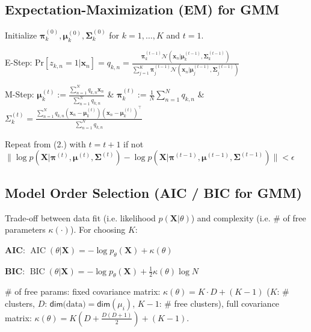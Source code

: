\documentclass[a4paper, 11pt, landscape]{article}
\newenvironment{inlinelist}%
{\begin{enumerate*}[label=\textbf{\color{red}\theenumi.}]}%
{\end{enumerate*}}
\begin{document}
\begin{multicols*}{3}
\subsection{Expectation-Maximization (EM) for GMM}
\begin{inlinelist}
	\item Initialize $\boldsymbol{\pi}_k^{(0)}, \boldsymbol{\mu}_k^{(0)}, \boldsymbol{\Sigma}_k^{(0)}$ for $k = 1, \ldots, K$ and $t=1$.
	\item E-Step: Pr$[z_{k,n} = 1 | \mathbf{x}_n] = q_{k, n} = \frac{\boldsymbol{\pi}_k^{(t-1)} \mathcal{N}(\mathbf{x}_n | \boldsymbol{\mu}_k^{(t-1)}, \boldsymbol{\Sigma}_k^{(t-1)})}{\sum_{j=1}^K \boldsymbol{\pi}_j^{(t-1)} \mathcal{N}(\mathbf{x}_n | \boldsymbol{\mu}_j^{(t-1)}, \boldsymbol{\Sigma}_j^{(t-1)})}$
	\item M-Step: $\boldsymbol{\mu}_k^{(t)} := \frac{\sum_{n=1}^N q_{k,n} \mathbf{x}_n}{\sum_{n=1}^N q_{k,n}}$\hspace{20pt} \& \hspace{20pt} $\boldsymbol{\pi}_k^{(t)} := \frac{1}{N} \sum_{n=1}^N q_{k,n}$ \hspace{20pt} \& \hspace{20pt} $\Sigma_k^{(t)} = \frac{\sum_{n=1}^N q_{k, n} (\mathbf{x}_n - \boldsymbol{\mu}_k^{(t)})(\mathbf{x}_n - \boldsymbol{\mu}_k^{(t)})^\top}{\sum_{n=1}^N q_{k,n}}$
	\item Repeat from (2.) with $t = t + 1$ if not $\| \log p(\mathbf{X} | \boldsymbol{\pi}^{(t)}, \boldsymbol{\mu}^{(t)}, \boldsymbol{\Sigma}^{(t)}) - \log p(\mathbf{X} | \boldsymbol{\pi}^{(t-1)}, \boldsymbol{\mu}^{(t-1)}, \boldsymbol{\Sigma}^{(t-1)}) \| < \epsilon$
\end{inlinelist}

\subsection{Model Order Selection (AIC / BIC for GMM)}
Trade-off between data fit (i.e. likelihood $p(\mathbf{X} | \theta)$) and complexity (i.e. \# of free parameters $\kappa(\cdot)$). For choosing $K$:
\begin{inparaitem}[\color{red}\textbullet]
	\item \textbf{AIC}: $\operatorname{AIC}(\theta | \mathbf{X}) = -\log p_\theta(\mathbf{X}) + \kappa(\theta)$
	\item \textbf{BIC}: $\operatorname{BIC}(\theta | \mathbf{X}) = -\log p_\theta(\mathbf{X}) + \frac{1}{2} \kappa(\theta) \log N$
	\item \# of free params: fixed covariance matrix: $\kappa(\theta) = K \cdot D + (K - 1)$ ($K$: \# clusters, $D$: $\mathsf{dim}\text{(data)}=\mathsf{dim}(\mu_i)$, $K-1$: \# free clusters), full covariance matrix: $\kappa(\theta) = K(D + \frac{D(D+1)}{2}) + (K - 1)$.
\end{inparaitem}


\end{multicols*}
\end{document}
